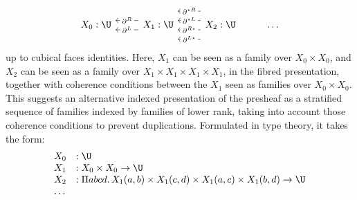 \documentclass{art.cls/art}
\newcommand{\kstar}{{\star}}
\begin{document}
\begin{equation*}
  \begin{tikzcd}
    X_0: \U & X_1: \U \arrow[l, "\partial^L" description, shift left=2] \arrow[l, "\partial^R" description, shift right=2] & X_2: \U \arrow[l, "\partial^{L\kstar}" description, shift left=6] \arrow[l, "\partial^{R\kstar}" description, shift left=2] \arrow[l, "\partial^{\kstar L}" description, shift right=2] \arrow[l, "\partial^{\kstar R}" description, shift right=6] & \ldots
  \end{tikzcd}
\end{equation*}
up to cubical faces identities. Here, $X_1$ can be seen as a family over $X_0 \times X_0$, and $X_2$ can be seen as a family over $X_1 \times X_1 \times X_1 \times X_1$, in the fibred presentation, together with coherence conditions between the $X_1$ seen as families over $X_0 \times X_0$. This suggests an alternative indexed presentation of the presheaf as a stratified sequence of families indexed by families of lower rank, taking into account those coherence conditions to prevent duplications. Formulated in type theory, it takes the form:
\begin{equation*}
  \begin{array}{lll}
    X_0 & :               \U                                                                          \\
    X_1 & :               X_0 \times X_0 \rightarrow  \U                                              \\
    X_2 & : \Pi a b c d.\,  X_1(a,b) \times X_1 (c,d) \times X_1(a,c) \times X_1 (b,d) \rightarrow \U \\
    \ldots
  \end{array}
\end{equation*}
\end{document}
